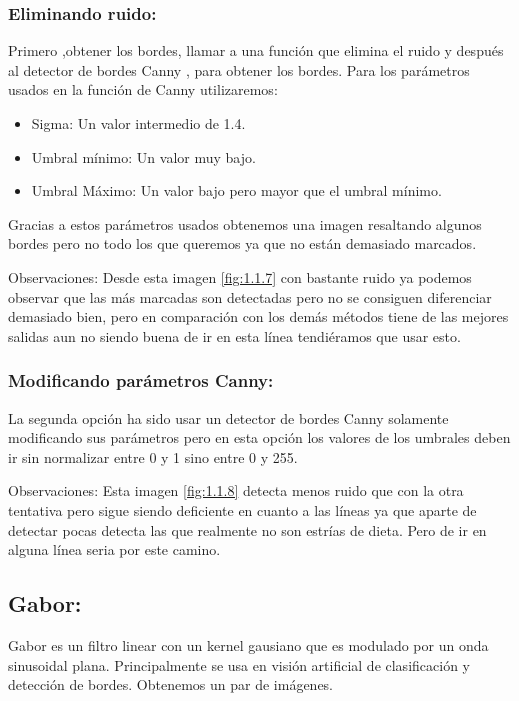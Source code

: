 \subsubsection{Eliminando ruido:}
Primero ,obtener los bordes, llamar a una función que elimina el ruido y después al detector de bordes Canny \cite{wiki:Canny}, para obtener los bordes.
Para los parámetros usados en la función de Canny utilizaremos:
\begin{itemize}
	\item Sigma: Un valor intermedio de 1.4.
	\item Umbral mínimo: Un valor muy bajo.
	\item Umbral Máximo: Un valor bajo pero mayor que el umbral mínimo.
\end{itemize}
Gracias a estos parámetros usados obtenemos una imagen resaltando algunos bordes pero no todo los que queremos ya que no están demasiado marcados.




Observaciones:
Desde esta imagen \ref{fig:1.1.7} con bastante ruido ya podemos observar que las más marcadas son detectadas pero no se consiguen diferenciar demasiado bien, pero en comparación con los demás métodos tiene de las mejores salidas aun no siendo buena de ir en esta línea tendiéramos que usar esto.

\subsubsection{Modificando parámetros Canny:}

La segunda opción ha sido usar un detector de bordes Canny solamente modificando sus parámetros pero en esta opción los valores de los umbrales deben ir sin normalizar entre 0 y 1 sino entre 0 y 255.


Observaciones:
Esta imagen \ref{fig:1.1.8} detecta menos ruido que con la otra tentativa pero sigue siendo deficiente en cuanto a las líneas ya que aparte de detectar pocas detecta las que realmente no son estrías de dieta. Pero de ir en alguna línea seria por este camino.



\subsection{Gabor:}

Gabor \cite{wiki:Gabor} es un filtro linear con un kernel gausiano  que es modulado por un onda sinusoidal plana. Principalmente se usa en visión artificial de clasificación y detección de bordes.
Obtenemos un par de imágenes.



